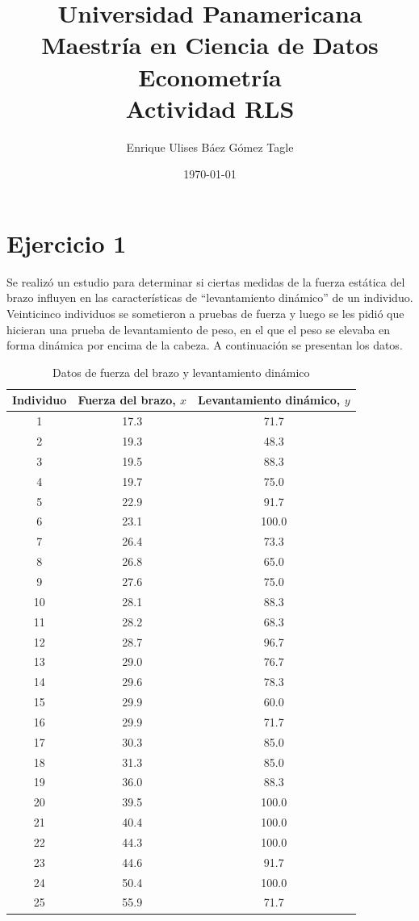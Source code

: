 \documentclass[10pt]{article}
\title{Universidad Panamericana \\ Maestría en Ciencia de Datos \\ Econometría \\ \vspace{0.5cm} Actividad RLS}
\author{Enrique Ulises Báez Gómez Tagle}
\date{\today}
\begin{document}
\maketitle

\tableofcontents

\newpage

\section{Ejercicio 1}
	Se realizó un estudio para determinar si ciertas medidas de la fuerza estática del brazo influyen en las características de ``levantamiento dinámico'' de un individuo. Veinticinco individuos se sometieron a pruebas de fuerza y luego se les pidió que hicieran una prueba de levantamiento de peso, en el que el peso se elevaba en forma dinámica por encima de la cabeza. A continuación se presentan los datos.

	\begin{table}[H]
		\centering
		\caption{Datos de fuerza del brazo y levantamiento dinámico}
		\label{tab:datos_fuerza}
		\begin{tabular}{|c|c|c|}
			\hline
			\textbf{Individuo} & \textbf{Fuerza del brazo, $x$} & \textbf{Levantamiento dinámico, $y$} \\
			\hline
			1  & 17.3 & 71.7 \\
			2  & 19.3 & 48.3 \\
			3  & 19.5 & 88.3 \\
			4  & 19.7 & 75.0 \\
			5  & 22.9 & 91.7 \\
			6  & 23.1 & 100.0 \\
			7  & 26.4 & 73.3 \\
			8  & 26.8 & 65.0 \\
			9  & 27.6 & 75.0 \\
			10 & 28.1 & 88.3 \\
			11 & 28.2 & 68.3 \\
			12 & 28.7 & 96.7 \\
			13 & 29.0 & 76.7 \\
			14 & 29.6 & 78.3 \\
			15 & 29.9 & 60.0 \\
			16 & 29.9 & 71.7 \\
			17 & 30.3 & 85.0 \\
			18 & 31.3 & 85.0 \\
			19 & 36.0 & 88.3 \\
			20 & 39.5 & 100.0 \\
			21 & 40.4 & 100.0 \\
			22 & 44.3 & 100.0 \\
			23 & 44.6 & 91.7 \\
			24 & 50.4 & 100.0 \\
			25 & 55.9 & 71.7 \\
			\hline
		\end{tabular}
	\end{table}
\end{document}
